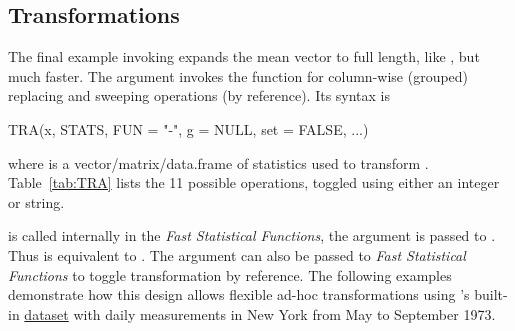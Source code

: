 \documentclass[nojss]{jss} %
\newcommand{\fct}[1]{\code{#1()}}
\begin{document}
\subsection{Transformations}
The final example invoking  expands the mean vector to full length, like , but much faster. The  argument invokes the \fct{TRA} function for column-wise (grouped) replacing and sweeping operations (by reference). Its syntax is
\begin{Code}
TRA(x, STATS, FUN = "-", g = NULL, set = FALSE, ...)
\end{Code}
where  is a vector/matrix/data.frame of statistics used to transform . Table~\ref{tab:TRA} lists the 11 possible  operations, toggled using either an integer or string.
%
\begin{table}[h!]
\caption{\label{tab:TRA} Available  choices in .}
\end{table}
%
 is called internally in the \emph{Fast Statistical Functions}, the  argument is passed to . Thus  is equivalent to . The  argument can also be passed to \emph{Fast Statistical Functions} to toggle transformation by reference. The following examples demonstrate how this design allows flexible ad-hoc transformations using 's built-in \href{https://www.rdocumentation.org/packages/datasets/versions/3.6.2/topics/airquality}{ dataset} with daily measurements in New York from May to September 1973.
\end{document}
